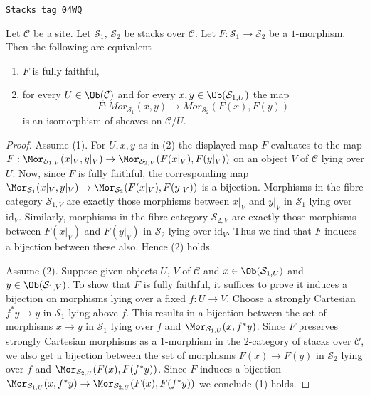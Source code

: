 \begin{lemma}[Characterize ff]
\label{stacks-lemma-characterize-ff}
\href{https://stacks.math.columbia.edu/tag/04WQ}{\texttt{Stacks tag 04WQ}}

Let $\mathcal{C}$ be a site.
Let $\mathcal{S}_1$, $\mathcal{S}_2$ be stacks over $\mathcal{C}$.
Let $F : \mathcal{S}_1 \to \mathcal{S}_2$ be a $1$-morphism.
Then the following are equivalent
\begin{enumerate}
\item $F$ is fully faithful,
\item for every $U \in \Ob(\mathcal{C})$ and for every
$x, y \in \Ob(\mathcal{S}_{1, U})$ the map
$$
F :
\mathit{Mor}_{\mathcal{S}_1}(x, y)
\longrightarrow
\mathit{Mor}_{\mathcal{S}_2}(F(x), F(y))
$$
is an isomorphism of sheaves on $\mathcal{C}/U$.
\end{enumerate}
\end{lemma}

\begin{proof}
Assume (1). For $U, x, y$ as in (2) the displayed map $F$ evaluates to the map
$F : \Mor_{\mathcal{S}_{1, V}}(x|_V, y|_V) \to
\Mor_{\mathcal{S}_{2, V}}(F(x|_V), F(y|_V))$
on an object $V$ of $\mathcal{C}$ lying over $U$.
Now, since $F$ is fully faithful, the corresponding map
$\Mor_{\mathcal{S}_1}(x|_V, y|_V) \to \Mor_{\mathcal{S}_2}(F(x|_V), F(y|_V))$
is a bijection. Morphisms in the fibre category $\mathcal{S}_{1, V}$ are
exactly those morphisms between $x|_V$ and $y|_V$ in $\mathcal{S}_1$ lying
over $\text{id}_V$. Similarly, morphisms in the fibre category
$\mathcal{S}_{2, V}$ are exactly those morphisms between $F(x|_V)$ and
$F(y|_V)$ in $\mathcal{S}_2$ lying over $\text{id}_V$. Thus we find that $F$
induces a bijection between these also. Hence (2) holds.

\medskip\noindent
Assume (2). Suppose given objects $U$, $V$ of $\mathcal{C}$ and
$x \in \Ob(\mathcal{S}_{1, U})$ and
$y \in \Ob(\mathcal{S}_{1, V})$. To show that $F$ is fully faithful,
it suffices to prove it induces a bijection on
morphisms lying over a fixed $f : U \to V$. Choose a strongly Cartesian
$f^*y \to y$ in $\mathcal{S}_1$ lying above $f$. This results in a
bijection between the set of morphisms $x \to y$ in $\mathcal{S}_1$ lying
over $f$ and $\Mor_{\mathcal{S}_{1, U}}(x, f^*y)$. Since $F$ preserves
strongly Cartesian morphisms as a $1$-morphism in the $2$-category
of stacks over $\mathcal{C}$, we also get a bijection
between the set of morphisms $F(x) \to F(y)$ in $\mathcal{S}_2$ lying
over $f$ and $\Mor_{\mathcal{S}_{2, U}}(F(x), F(f^*y))$.
Since $F$ induces a bijection
$\Mor_{\mathcal{S}_{1, U}}(x, f^*y) \to
\Mor_{\mathcal{S}_{2, U}}(F(x), F(f^*y))$
we conclude (1) holds.
\end{proof}

